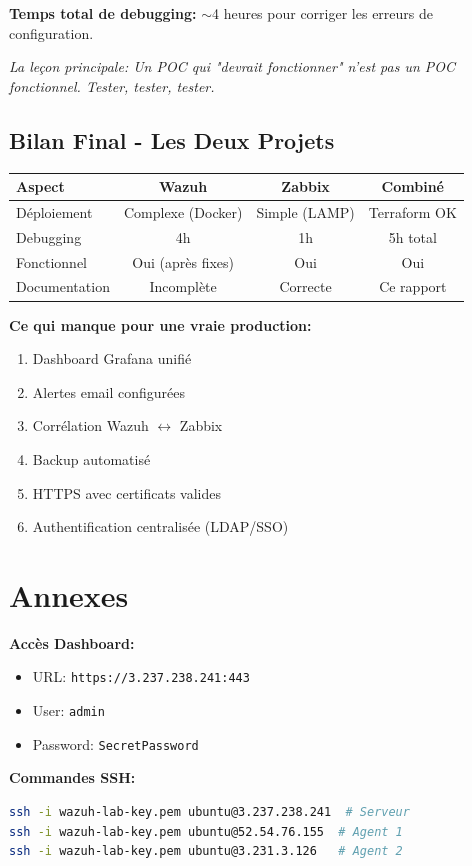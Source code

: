 \documentclass[12pt,a4paper]{article}
\begin{document}
\textbf{Temps total de debugging:} $\sim$4 heures pour corriger les erreurs de configuration.

\textit{La leçon principale: Un POC qui "devrait fonctionner" n'est pas un POC fonctionnel. Tester, tester, tester.}

\subsection{Bilan Final - Les Deux Projets}

\begin{center}
\begin{tabular}{|l|c|c|c|}
\hline
\textbf{Aspect} & \textbf{Wazuh} & \textbf{Zabbix} & \textbf{Combiné} \\
\hline
Déploiement & Complexe (Docker) & Simple (LAMP) & Terraform OK \\
Debugging & 4h & 1h & 5h total \\
Fonctionnel & Oui (après fixes) & Oui & Oui \\
Documentation & Incomplète & Correcte & Ce rapport \\
\hline
\end{tabular}
\end{center}

\textbf{Ce qui manque pour une vraie production:}
\begin{enumerate}
    \item Dashboard Grafana unifié
    \item Alertes email configurées
    \item Corrélation Wazuh $\leftrightarrow$ Zabbix
    \item Backup automatisé
    \item HTTPS avec certificats valides
    \item Authentification centralisée (LDAP/SSO)
\end{enumerate}

\section*{Annexes}

\textbf{Accès Dashboard:}
\begin{itemize}
    \item URL: \texttt{https://3.237.238.241:443}
    \item User: \texttt{admin}
    \item Password: \texttt{SecretPassword}
\end{itemize}

\textbf{Commandes SSH:}
\begin{lstlisting}[language=bash]
ssh -i wazuh-lab-key.pem ubuntu@3.237.238.241  # Serveur
ssh -i wazuh-lab-key.pem ubuntu@52.54.76.155  # Agent 1
ssh -i wazuh-lab-key.pem ubuntu@3.231.3.126   # Agent 2
\end{lstlisting}
\end{document}
